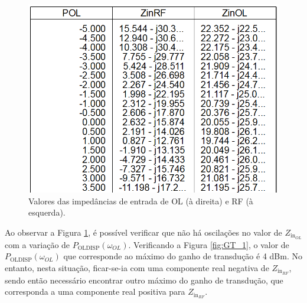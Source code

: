\documentclass[11pt]{article}
\numberwithin{equation}{section}
\begin{document}
\begin{figure}[h]
\centering
\includegraphics[keepaspectratio=true, scale=0.39]{exps/Z_20}
\vspace{-0.5em}
\caption{Valores das impedâncias de entrada de OL (à direita) e RF (à esquerda).}
\vspace{-0.8em}
\label{fig:Imp_OL_RF}
\end{figure}

Ao observar a Figura \ref{fig:Imp_OL_RF}, é possível verificar que não há oscilações no valor de $ Z_{\text{in}_{OL}} $ com a variação de $ P_{\text{OLDISP}}\left(\omega_{OL}\right) $. Verificando a Figura \ref{fig:GT_1}, o valor de $ P_{\text{OLDISP}}\left(\omega_{OL}\right) $ que corresponde ao máximo do ganho de transdução é 4 dBm. No entanto, nesta situação, ficar-se-ia com uma componente real negativa de $ Z_{\text{in}_{RF}} $, sendo então necessário encontrar outro máximo do ganho de transdução, que corresponda a uma componente real positiva para  $ Z_{\text{in}_{RF}} $.
\end{document}
